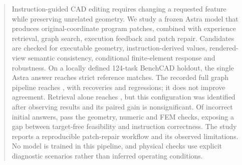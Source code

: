 \begin{abstract}
Instruction-guided CAD editing requires changing a requested feature while preserving unrelated geometry. We study a frozen Astra model that produces original-coordinate program patches, combined with experience retrieval, graph search, execution feedback and patch repair. Candidates are checked for executable geometry, instruction-derived values, rendered-view semantic consistency, conditional finite-element response and robustness. On a locally defined 124-task BenchCAD holdout, the single Astra answer reaches \pipeAstra{} strict reference matches. The recorded full graph pipeline reaches \pipeFull{}, with \pipeFullGain{} recoveries and \pipeFullLoss{} regressions; it does not improve agreement. Retrieval alone reaches \pipeRag{}, but this configuration was identified after observing results and its paired gain is nonsignificant. Of \pipeWrong{} incorrect initial answers, \pipeWrongPass{} pass the geometry, numeric and FEM checks, exposing a gap between target-free feasibility and instruction correctness. The study reports a reproducible patch-repair workflow and its observed limitations. No model is trained in this pipeline, and physical checks use explicit diagnostic scenarios rather than inferred operating conditions.
\end{abstract}
